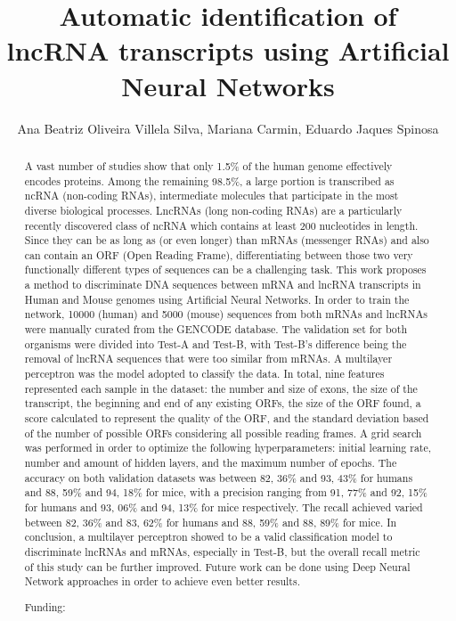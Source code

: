 \documentclass[twoside]{article}
\title{\vspace{-15mm}\fontsize{24pt}{10pt}\selectfont\textbf{ Automatic identification of lncRNA transcripts using Artificial Neural Networks }} %
\author{ Ana Beatriz Oliveira Villela Silva, Mariana Carmin, Eduardo Jaques Spinosa }
\affil{ Universidade Federal do Paran\'a }
\date{}
\begin{document}
  
  
  \maketitle %
  
  
  \thispagestyle{fancy} %
  
  
  \begin{abstract}
  A vast number of studies show that only 1.5\% of the human genome effectively encodes proteins. Among the remaining 98.5\%,  a large portion is transcribed as ncRNA (non-coding RNAs),  intermediate molecules that participate in the most diverse biological processes. LncRNAs (long non-coding RNAs) are a particularly recently discovered class of ncRNA which contains at least 200 nucleotides in length. Since they can be as long as (or even longer) than mRNAs (messenger RNAs) and also can contain an ORF (Open Reading Frame),  differentiating between those two very functionally different types of sequences can be a challenging task. This work proposes a method to discriminate DNA sequences between mRNA and lncRNA transcripts in Human and Mouse genomes using Artificial Neural Networks. In order to train the network,  10000 (human) and 5000 (mouse) sequences from both mRNAs and lncRNAs were manually curated from the GENCODE database. The validation set for both organisms were divided into Test-A and Test-B,  with Test-B's difference being the removal of lncRNA sequences that were too similar from mRNAs. A multilayer perceptron was the model adopted to classify the data. In total,  nine features represented each sample in the dataset: the number and size of exons,  the size of the transcript,  the beginning and end of any existing ORFs,  the size of the ORF found,  a score calculated to represent the quality of the ORF,  and the standard deviation based of the number of possible ORFs considering all possible reading frames.  A grid search was performed in order to optimize the following hyperparameters: initial learning rate,  number and amount of hidden layers,  and the maximum number of epochs.  The accuracy on both validation datasets was between 82, 36\% and 93, 43\% for humans and 88, 59\% and 94, 18\% for mice,  with a precision ranging from 91, 77\% and 92, 15\% for humans and 93, 06\% and 94, 13\% for mice respectively. The recall achieved varied between 82, 36\% and 83, 62\% for humans and 88, 59\% and 88, 89\% for mice.  In conclusion,  a multilayer perceptron showed to be a valid classification model to discriminate lncRNAs and mRNAs,  especially in Test-B,  but the overall recall metric of this study can be further improved. Future work can be done using Deep Neural Network approaches in order to achieve even better results.
  
  Funding:  \\ 
  \end{abstract}
  
\end{document}
